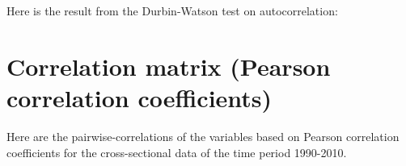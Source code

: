 \documentclass[abstract=on]{scrartcl}
\begin{document}
Here is the result from the Durbin-Watson test on autocorrelation:



\newpage

\section{Correlation matrix (Pearson correlation coefficients)}

Here are the pairwise-correlations of the variables based on Pearson correlation coefficients for the cross-sectional data of the time period 1990-2010.

\end{document}
